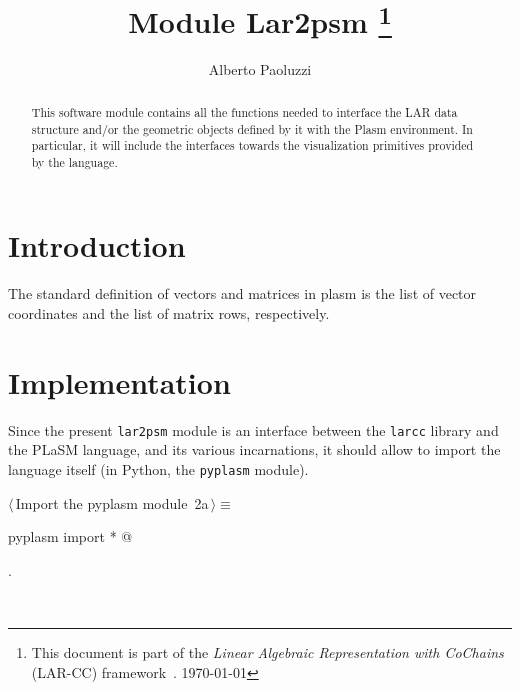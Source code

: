 \documentclass[11pt,oneside]{article}	%
\title{Module Lar2psm
\footnote{This document is part of the \emph{Linear Algebraic Representation with CoChains} (LAR-CC) framework~\cite{cclar-proj:2013:00}. \today}
}
\author{Alberto Paoluzzi}
\begin{document}
\maketitle

\begin{abstract}
This software module contains all the functions needed to interface the LAR data structure and/or the geometric  objects defined by it with the Plasm environment. In particular, it will include the interfaces towards the visualization primitives provided by the language.
\end{abstract}



\tableofcontents
\newpage

\section{Introduction}
The standard definition of vectors and matrices in plasm is the list of vector coordinates and the list of matrix rows, respectively.

\section{Implementation}

Since the present \texttt{lar2psm} module is an interface between the \texttt{larcc} library and the PLaSM language, and its various incarnations, it should allow to import the language itself (in Python, the \texttt{pyplasm} module). 
\begin{flushleft} \small
\begin{minipage}{\linewidth} \label{scrap1}
\protect{}$\langle\,$Import the pyplasm module\nobreak\ {\footnotesize 2a}$\,\rangle\equiv$
\vspace{-1ex}
\begin{list}{}{} \item
\mbox{}\verb@from pyplasm import * @\\
\mbox{}\verb@@{\NWsep}
\end{list}
\vspace{-1ex}
\footnotesize\addtolength{\baselineskip}{-1ex}
\begin{list}{}{\setlength{\itemsep}{-\parsep}\setlength{\itemindent}{-\leftmargin}}
\item {\NWtxtMacroNoRef}.
\end{list}
\end{minipage}\\[4ex]
\end{flushleft}
\end{document}
